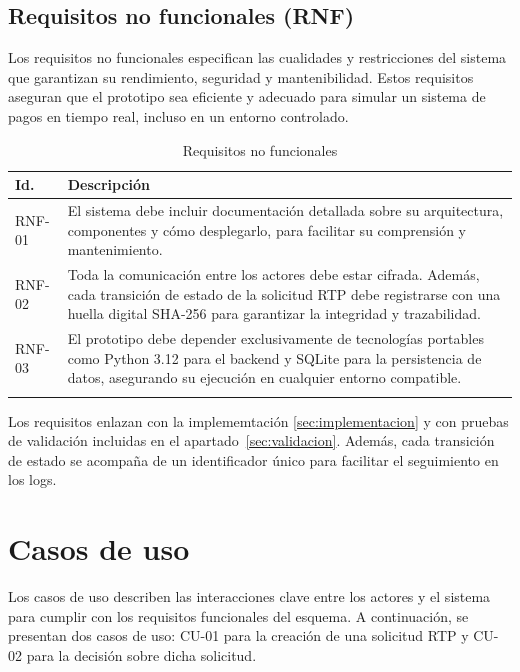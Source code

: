 \subsection{Requisitos no funcionales (RNF)}
Los requisitos no funcionales especifican las cualidades y restricciones del sistema que garantizan su rendimiento, seguridad y mantenibilidad. Estos requisitos aseguran que el prototipo sea eficiente y adecuado para simular un sistema de pagos en tiempo real, incluso en un entorno controlado.

\begin{longtable}{@{}>{\raggedright\arraybackslash}p{}p{}@{}}
\toprule
\textbf{Id.} & \textbf{Descripción} \\
\midrule\endhead
RNF-01 & El sistema debe incluir documentación detallada sobre su arquitectura, componentes y cómo desplegarlo, para facilitar su comprensión y mantenimiento. \\
RNF-02 & Toda la comunicación entre los actores debe estar cifrada. Además, cada transición de estado de la solicitud RTP debe registrarse con una huella digital SHA-256 para garantizar la integridad y trazabilidad. \\
RNF-03 & El prototipo debe depender exclusivamente de tecnologías portables como Python 3.12 para el backend y SQLite para la persistencia de datos, asegurando su ejecución en cualquier entorno compatible. \\
\bottomrule
\caption{Requisitos no funcionales}
\label{tab:RNF}
\end{longtable}

Los requisitos enlazan con la implememtación \ref{sec:implementacion} y con pruebas de validación incluidas en el apartado~\ref{sec:validacion}. Además, cada transición de estado se acompaña de un identificador único para facilitar el seguimiento en los logs.

\section{Casos de uso}
\label{subsec:diseno_casos_uso}

Los casos de uso describen las interacciones clave entre los actores y el sistema para cumplir con los requisitos funcionales del esquema. A continuación, se presentan dos casos de uso: CU-01 para la creación de una solicitud RTP y CU-02 para la decisión sobre dicha solicitud.

